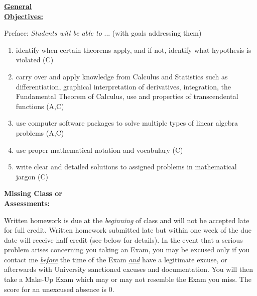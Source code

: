 \documentclass{article}
\theoremstyle{plain}
\theoremstyle{definition}
\theoremstyle{remark}
\begin{document}

\vskip0.1in \noindent
\begin{minipage}[t]{1.2in}
	\underline{\textbf{General}} \\ \underline{\textbf{Objectives:}}
\end{minipage}
\begin{minipage}[t]{5.3in}
Preface:  \emph{Students will be able to} ... (with goals addressing them)
\begin{enumerate}
\item	identify when certain theorems apply, and if not, identify what hypothesis is violated (C)
\item	carry over and apply knowledge from Calculus and Statistics such as differentiation, graphical interpretation of derivatives, integration, the Fundamental Theorem of  Calculus, use and properties of transcendental functions (A,C)
\item	use computer software packages to solve multiple types of linear algebra problems (A,C)
\item use proper mathematical notation and vocabulary (C)
\item	write clear and detailed solutions to assigned problems in mathematical jargon (C)
\end{enumerate}
\end{minipage}



\vskip0.1in \noindent
\begin{minipage}[t]{1.3in}
\textbf{Missing Class or} \\ \textbf{Assessments:}
\end{minipage}
\begin{minipage}[t]{5.2in}
	Written homework is due at the \emph{beginning} of class and will not be accepted late for full credit.  Written homework submitted late but within one week of the due date will receive half credit (see below for details).
	\vskip0.1in \noindent In the event that a serious problem arises concerning you taking  an Exam, you may be excused only if you contact me \underline{\emph{before}} the time of the Exam \underline{\emph{and}} have a legitimate excuse, or afterwards with University sanctioned excuses and documentation. You will then take a Make-Up 
	Exam which may or may not resemble the Exam you miss.  The score for an unexcused absence is 0.
\end{minipage}
\end{document}
